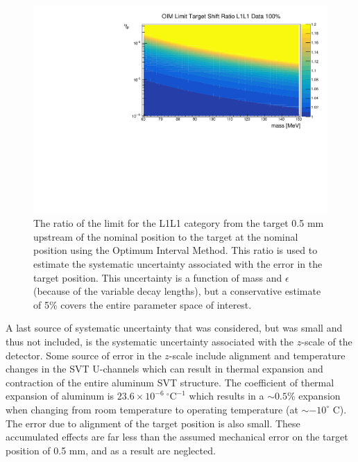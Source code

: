 \begin{figure}[t]
    \centering
    \includegraphics[width=.85\textwidth]{figs/Results/targetshift_syst.pdf}
    \caption{The ratio of the limit for the L1L1 category from the target 0.5 mm upstream of the nominal position to the target at the nominal position using the Optimum Interval Method. This ratio is used to estimate the systematic uncertainty associated with the error in the target position. This uncertainty is a function of mass and $\epsilon$  (because of the variable decay lengths), but a conservative estimate of 5\% covers the entire parameter space of interest. }
    \label{fig:OIM_syst}
\end{figure}

A last source of systematic uncertainty that was considered, but was small and thus not included, is the systematic uncertainty associated with the $z$-scale of the detector. Some source of error in the $z$-scale include alignment and temperature changes in the SVT U-channels which can result in thermal expansion and contraction of the entire aluminum SVT structure. The coefficient of thermal expansion of aluminum is $23.6 \times 10^{-6} \ ^{\circ}\mathrm{C}^{-1}$ which results in a $\sim0.5$\% expansion when changing from room temperature to operating temperature (at $\sim -10^{\circ}$ C). The error due to alignment of the target position is also small. These accumulated effects are far less than the assumed mechanical error on the target position of 0.5 mm, and as a result are neglected.

